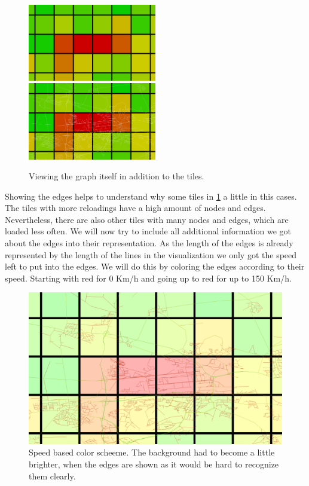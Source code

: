 \documentclass
[
	paper = a4,
    pagesize,
	12 pt,
	oneside,                       %
    open = right,
	DIV = calc,
	BCOR = 0 mm,                   %
	bibtotoc
]
{scrbook}
\begin{document}
\begin{figure}[H]
    \includegraphics[width=0.5\textwidth]{Images/vis-edges-no.png}
    \includegraphics[width=0.5\textwidth]{Images/vis-edges-white.png}
\caption[]{Viewing the graph itself in addition to the tiles.}
\label{fig:white edges}
\end{figure}

Showing the edges helps to understand why some tiles in \cref{fig:white edges} a little in this cases.
The tiles with more reloadings have a high amount of nodes and edges.
Nevertheless, there are also other tiles with many nodes and edges, which are loaded less often.
We will now try to include all additional information we got about the edges into their representation.
As the length of the edges is already represented by the length of the lines in the visualization we only got the speed left to put into the edges.
We will do this by coloring the edges according to their speed.
Starting with red for 0 Km/h and going up to red for up to 150 Km/h.

\begin{figure}[H]
    \includegraphics[width=\textwidth]{Images/vis-edges-hsv.png}
\caption[]{Speed based color scheeme. The background had to become a little brighter, when the edges are shown as it would be hard to recognize them clearly. }
\label{fig:colored edges}
\end{figure}
\end{document}
